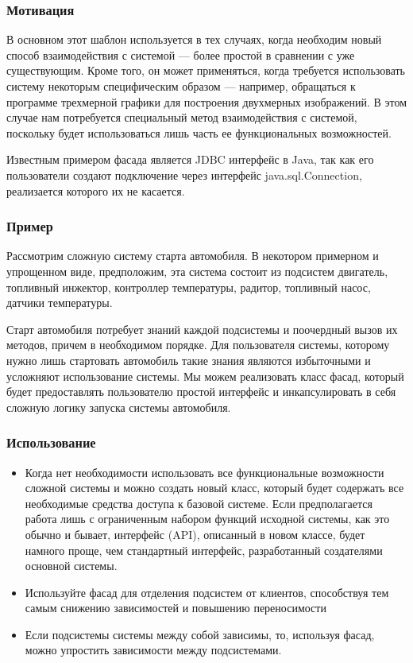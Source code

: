 \documentclass[10pt]{article}
\begin{document}
\subsubsection{Мотивация}
В основном этот шаблон используется в тех случаях, когда необходим новый
способ взаимодействия с системой --- более простой в сравнении с уже существующим.
Кроме того, он может применяться, когда требуется использовать систему некоторым
специфическим образом --- например, обращаться к программе трехмерной графики
для построения двухмерных изображений. В этом случае нам потребуется специальный
метод взаимодействия с системой, поскольку будет использоваться лишь часть ее
функциональных возможностей.

Известным примером фасада является JDBC интерфейс в Java, так как его пользователи
создают подключение через интерфейс java.sql.Connection, реализается
которого их не касается.

\subsubsection{Пример}
Рассмотрим сложную систему старта автомобиля. В некотором примерном и упрощенном виде,
предположим, эта система состоит из подсистем двигатель, топливный инжектор,
контроллер температуры, радитор, топливный насос, датчики температуры.

Старт автомобиля потребует знаний каждой подсистемы и поочердный вызов
их методов, причем в необходимом порядке. Для пользователя системы, которому
нужно лишь стартовать автомобиль такие знания являются избыточными и усложняют
использование системы. Мы можем реализовать класс фасад, который будет предоставлять
пользователю простой интерфейс и инкапсулировать в себя сложную логику запуска системы автомобиля.

\subsubsection{Использование}
\begin{itemize}
	\item  Когда нет необходимости использовать все функциональные возможности
сложной системы и можно создать новый класс, который будет содержать все
необходимые средства доступа к базовой системе. Если предполагается работа
лишь с ограниченным набором функций исходной системы, как это обычно и
бывает, интерфейс (API), описанный в новом классе, будет намного проще, чем
стандартный интерфейс, разработанный создателями основной системы.
	\item Используйте фасад для отделения подсистем от клиентов,
	способствуя тем самым снижению зависимостей и повышению переносимости
	\item Если подсистемы системы между собой зависимы, то, используя фасад,
		можно упростить зависимости между подсистемами.
\end{itemize}
\end{document}
